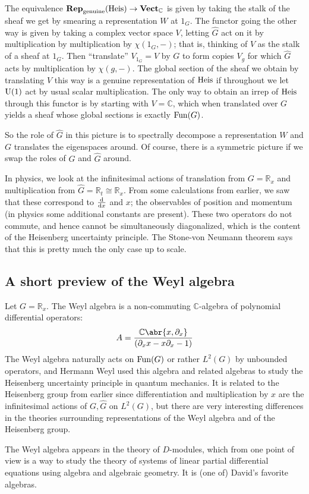 \documentclass[../../rtnotes.tex]{subfiles}
\begin{document}
The equivalence ${\normalfont\mathbf{Rep}}_{\textrm{genuine}}(\operatorname{Heis})\to {\normalfont\mathbf{Vect}}_{\mathbb C}$ is given by taking the stalk of the sheaf we get by smearing a representation $W$ at $1_G$. The functor going the other way is given by taking a complex vector space $V$, letting $\widehat G$ act on it by multiplication by multiplication by $\chi(1_G,-)$; that is, thinking of $V$ as the stalk of a sheaf at $1_G$. Then ``translate'' $V_{1_G} = V$ by $G$ to form copies $V_g$ for which $\widehat G$ acts by multiplication by $\chi(g,-)$. The global section of the sheaf we obtain by translating $V$ this way is a genuine representation of $\operatorname{Heis}$ if throughout we let $\operatorname{U}(1)$ act by usual scalar multiplication. The only way to obtain an irrep of $\operatorname{Heis}$ through this functor is by starting with $V = \mathbb C$, which when translated over $G$ yields a sheaf whose global sections is exactly $\operatorname{Fun}(G)$.

So the role of $\widehat G$ in this picture is to spectrally decompose a representation $W$ and $G$ translates the eigenspaces around. Of course, there is a symmetric picture if we swap the roles of $G$ and $\widehat G$ around.

In physics, we look at the infinitesimal actions of translation from $G = \mathbb R_x$ and multiplication from $\widehat G = \mathbb R_t\cong \mathbb R_x$. From some calculations from earlier, we saw that these correspond to $\dv{x}$ and $x$; the observables of position and momentum (in physics some additional constants are present). These two operators do not commute, and hence cannot be simultaneously diagonalized, which is the content of the Heisenberg uncertainty principle. The Stone-von Neumann theorem says that this is pretty much the only case up to scale.

\subsection{A short preview of the Weyl algebra}
Let $G = \mathbb R_x$. The Weyl algebra is a non-commuting $\mathbb C$-algebra of polynomial differential operators:
\[A = \frac{\mathbb C\abr{x,\partial_x}}{(\partial_xx-x\partial_x - 1)}\]
The Weyl algebra naturally acts on $\operatorname{Fun}(G)$ or rather $L^2(G)$ by unbounded operators, and Hermann Weyl used this algebra and related algebras to study the Heisenberg uncertainty principle in quantum mechanics. It is related to the Heisenberg group from earlier since differentiation and multiplication by $x$ are the infinitesimal actions of $G, \widehat G$ on $L^2(G)$, but there are very interesting differences in the theories surrounding representations of the Weyl algebra and of the Heisenberg group.

The Weyl algebra appears in the theory of $D$-modules, which from one point of view is a way to study the theory of systems of linear partial differential equations using algebra and algebraic geometry. It is (one of) David's favorite algebras.
\end{document}
